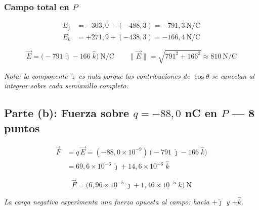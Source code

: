\documentclass[12pt,letterpaper]{article}
\begin{document}
\subsubsection*{Campo total en $P$}

\begin{align*}
    E_j &= -303{,}0 + (-488{,}3) = -791{,}3\ \text{N/C}\\
    E_k &= +271{,}9 + (-438{,}3) = -166{,}4\ \text{N/C}
\end{align*}

\[
\boxed{\vec{E} = \bigl(-791\;\hat{\jmath} - 166\;\hat{k}\bigr)\ \text{N/C}
\qquad \|\vec{E}\| = \sqrt{791^2+166^2} \approx 810\ \text{N/C}}
\]

\vspace{0.2cm}
\textit{Nota: la componente $\hat{\imath}$ es nula porque las contribuciones de $\cos\theta$ se cancelan al integrar sobre cada semianillo completo.}

\subsection*{Parte (b): Fuerza sobre $q = -88{,}0$ nC en $P$ — 8 puntos}

\begin{align*}
    \vec{F} &= q\,\vec{E} = (-88{,}0\times10^{-9})\,\bigl(-791\;\hat{\jmath} - 166\;\hat{k}\bigr)\\
            &= 69{,}6\times10^{-6}\;\hat{\jmath} + 14{,}6\times10^{-6}\;\hat{k}
\end{align*}

\[
\boxed{\vec{F} = \bigl(6{,}96\times10^{-5}\;\hat{\jmath} + 1{,}46\times10^{-5}\;\hat{k}\bigr)\ \text{N}}
\]

\vspace{0.2cm}
\textit{La carga negativa experimenta una fuerza opuesta al campo: hacia $+\hat{\jmath}$ y $+\hat{k}$.}
\end{document}
